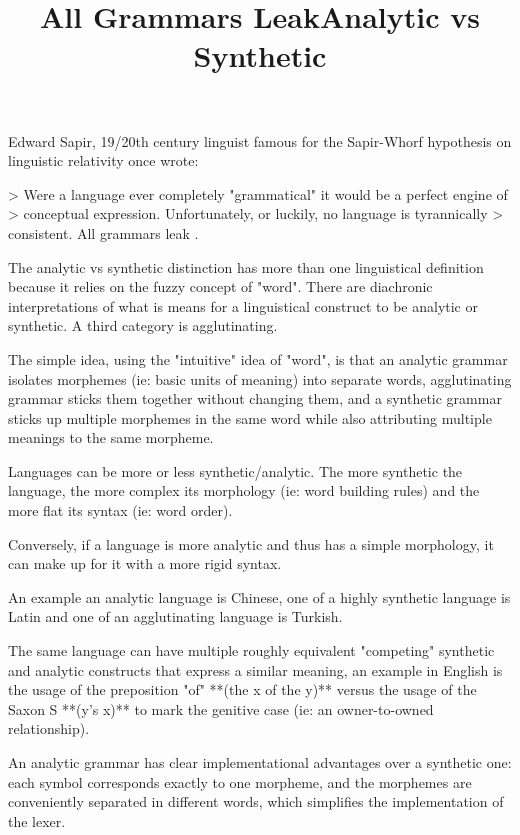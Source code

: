 \title{ All Grammars Leak}

Edward Sapir, 19/20th century linguist famous for the Sapir-Whorf hypothesis on linguistic relativity once wrote: 

> Were a language ever completely "grammatical" it would be a perfect engine of 
> conceptual expression. Unfortunately, or luckily, no language is tyrannically
> consistent. All grammars leak \cite{sapir1921language}.




\title{Analytic vs Synthetic}

The analytic vs synthetic distinction has more than one linguistical definition because it relies on the fuzzy concept of "word". There are diachronic interpretations of what is means for a linguistical construct to be analytic or synthetic. A third category is agglutinating.

The simple idea, using the "intuitive" idea of "word", is that an analytic grammar isolates morphemes (ie: basic units of meaning) into separate words, agglutinating grammar sticks them together without changing them, and a synthetic grammar sticks up multiple morphemes in the same word while also attributing multiple meanings to the same morpheme.

Languages can be more or less synthetic/analytic. The more synthetic the language, the more complex its morphology (ie: word building rules) and the more flat its syntax (ie: word order).

Conversely, if a language is more analytic and thus has a simple morphology, it can make up for it with a more rigid syntax.

An example an analytic language is Chinese, one of a highly synthetic language is Latin and one of an agglutinating language is Turkish.

The same language can have multiple roughly equivalent "competing" synthetic and analytic constructs that express a similar meaning, an example in English is the usage of the preposition "of" **(the x of the y)** versus the usage of the Saxon S **(y's x)** to mark the genitive case (ie: an owner-to-owned relationship).

An analytic grammar has clear implementational advantages over a synthetic one: each symbol corresponds exactly to one morpheme, and the morphemes are conveniently separated in different words, which simplifies the implementation of the lexer.

